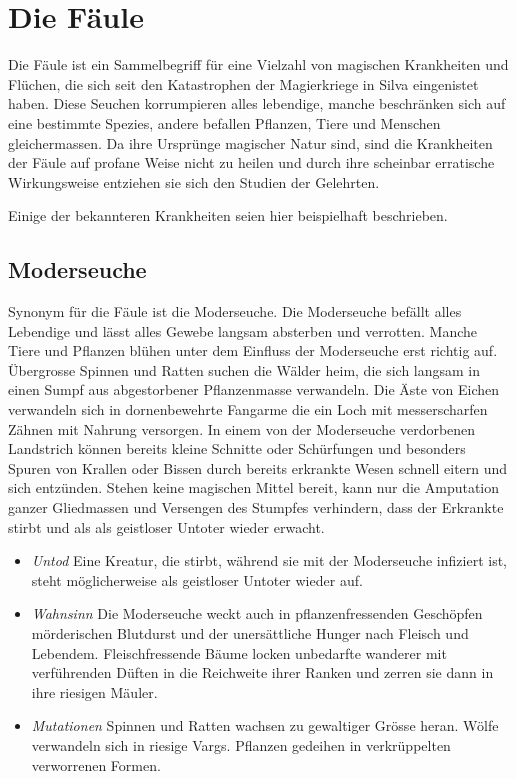 \documentclass[10pt,twoside,twocolumn,openany]{book}
\begin{document}
\section{Die Fäule}
Die Fäule ist ein Sammelbegriff für eine Vielzahl von magischen Krankheiten und Flüchen, die sich seit den Katastrophen der Magierkriege in Silva eingenistet haben. Diese Seuchen korrumpieren alles lebendige, manche beschränken sich auf eine bestimmte Spezies, andere befallen Pflanzen, Tiere und Menschen gleichermassen. Da ihre Ursprünge magischer Natur sind, sind die Krankheiten der Fäule auf profane Weise nicht zu heilen und durch ihre scheinbar erratische Wirkungsweise entziehen sie sich den Studien der Gelehrten.

Einige der bekannteren Krankheiten seien hier beispielhaft beschrieben.

\subsection{Moderseuche}
Synonym für die Fäule ist die Moderseuche. Die Moderseuche befällt alles Lebendige und lässt alles Gewebe langsam absterben und verrotten. Manche Tiere und Pflanzen blühen unter dem Einfluss der Moderseuche erst richtig auf. Übergrosse Spinnen und Ratten suchen die Wälder heim, die sich langsam in einen Sumpf aus abgestorbener Pflanzenmasse verwandeln. Die Äste von Eichen verwandeln sich in dornenbewehrte Fangarme die ein Loch mit messerscharfen Zähnen mit Nahrung versorgen. In einem von der Moderseuche verdorbenen Landstrich können bereits kleine Schnitte oder Schürfungen und besonders Spuren von Krallen oder Bissen durch bereits erkrankte Wesen schnell eitern und sich entzünden. Stehen keine magischen Mittel bereit, kann nur die Amputation ganzer Gliedmassen und Versengen des Stumpfes verhindern, dass der Erkrankte stirbt und als als geistloser Untoter wieder erwacht.


\begin{itemize}
	\item \textit{Untod} Eine Kreatur, die stirbt, während sie mit der Moderseuche infiziert ist, steht möglicherweise als geistloser Untoter wieder auf.
	
	\item \emph{Wahnsinn} Die Moderseuche weckt auch in pflanzenfressenden Geschöpfen mörderischen Blutdurst und der unersättliche Hunger nach Fleisch und Lebendem. Fleischfressende Bäume locken unbedarfte wanderer mit verführenden Düften in die Reichweite ihrer Ranken und zerren sie dann in ihre riesigen Mäuler.
	
	\item \emph{Mutationen} Spinnen und Ratten wachsen zu gewaltiger Grösse heran. Wölfe verwandeln sich in riesige Vargs. Pflanzen gedeihen in verkrüppelten verworrenen Formen.
\end{itemize}
\end{document}
